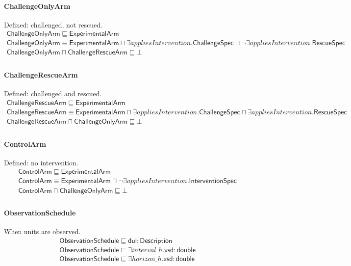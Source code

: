 \documentclass[10pt]{article}
\begin{document}
\paragraph{ChallengeOnlyArm} Defined: challenged, not rescued.
\[\begin{array}{l}
\mathsf{ChallengeOnlyArm} \sqsubseteq  \mathsf{ExperimentalArm} \\
\mathsf{ChallengeOnlyArm} \equiv  \mathsf{ExperimentalArm} \sqcap  \exists \mathit{appliesIntervention}.\mathsf{ChallengeSpec} \sqcap  \neg \exists \mathit{appliesIntervention}.\mathsf{RescueSpec} \\
\mathsf{ChallengeOnlyArm} \sqcap  \mathsf{ChallengeRescueArm} \sqsubseteq  \bot  \\
\end{array}\]
\paragraph{ChallengeRescueArm} Defined: challenged and rescued.
\[\begin{array}{l}
\mathsf{ChallengeRescueArm} \sqsubseteq  \mathsf{ExperimentalArm} \\
\mathsf{ChallengeRescueArm} \equiv  \mathsf{ExperimentalArm} \sqcap  \exists \mathit{appliesIntervention}.\mathsf{ChallengeSpec} \sqcap  \exists \mathit{appliesIntervention}.\mathsf{RescueSpec} \\
\mathsf{ChallengeRescueArm} \sqcap  \mathsf{ChallengeOnlyArm} \sqsubseteq  \bot  \\
\end{array}\]
\paragraph{ControlArm} Defined: no intervention.
\[\begin{array}{l}
\mathsf{ControlArm} \sqsubseteq  \mathsf{ExperimentalArm} \\
\mathsf{ControlArm} \equiv  \mathsf{ExperimentalArm} \sqcap  \neg \exists \mathit{appliesIntervention}.\mathsf{InterventionSpec} \\
\mathsf{ControlArm} \sqcap  \mathsf{ChallengeOnlyArm} \sqsubseteq  \bot  \\
\end{array}\]
\paragraph{ObservationSchedule} When units are observed.
\[\begin{array}{l}
\mathsf{ObservationSchedule} \sqsubseteq  \mathsf{dul{:}Description} \\
\mathsf{ObservationSchedule} \sqsubseteq  \exists \mathit{interval\_h}.\mathsf{xsd{:}double} \\
\mathsf{ObservationSchedule} \sqsubseteq  \exists \mathit{horizon\_h}.\mathsf{xsd{:}double} \\
\end{array}\]
\end{document}
